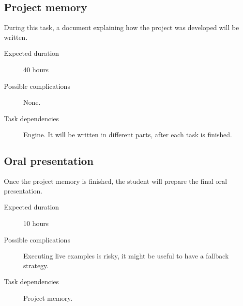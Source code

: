 \documentclass[a4paper,11pt,titlepage,abstract,numbers=noenddot,automark,mnsy,intlimits,rgb,dvipsnames]{report}
\begin{document}
\subsection{Project memory}
During this task, a document explaining how the project was developed will be written.
\begin{description}
\item[Expected duration]
40 hours
\item[Possible complications]
None.
\item[Task dependencies]
Engine. It will be written in different parts, after each task is finished.
\end{description}
\subsection{Oral presentation}
Once the project memory is finished, the student will prepare the final oral presentation.
\begin{description}
\item[Expected duration]
10 hours
\item[Possible complications]
Executing live examples is risky, it might be useful to have a fallback strategy.
\item[Task dependencies]
Project memory.
\end{description}
\end{document}
